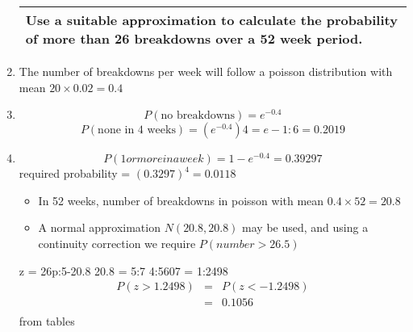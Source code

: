 \documentclass[a4paper,12pt]{article}
\begin{document}
\begin{enumerate}
\begin{table}[ht!]
\begin{tabular}{|p{15cm}|}
Use a suitable approximation to calculate the probability of more than 26 breakdowns over a 52 week period.   
 \\ \hline 
      \end{tabular}
    \end{table}
\item  The number of breakdowns per week will follow a poisson distribution with mean
$20 \times 0.02 = 0.4$
\item 
\[P(\mbox{no breakdowns}) = e^{-0.4}\]
\[P(\mbox{none in 4 weeks}) = (e^{-0.4})4 = e-1:6 = 0.2019\]
\item 
\[P(1 or more in a week) = 1 - e^{-0.4} = 0.39297\]
required probability = $(0.3297)^4 = 0.0118$
\begin{itemize}
    \item In 52 weeks, number of breakdowns in poisson with mean $0.4 \times 52 = 20.8$ 
    \item A normal
approximation $N(20.8,20.8)$ may be used, and using a continuity correction we
require $P(number > 26.5)$
\end{itemize}

z = 26p:5-20.8
20.8 = 5:7
4:5607 = 1:2498
\begin{eqnarray*}
P(z > 1.2498) 
&=& P(z < -1.2498) \\
&=& 0.1056\\
\end{eqnarray*} from tables
\end{enumerate}
\end{document}
